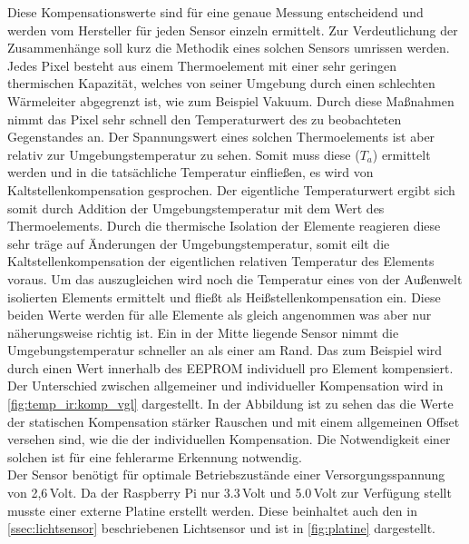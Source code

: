 \documentclass{sigchi}
\begin{document}
Diese Kompensationswerte sind für eine genaue Messung entscheidend und werden vom Hersteller für jeden Sensor einzeln ermittelt. Zur Verdeutlichung der Zusammenhänge soll kurz die Methodik eines solchen Sensors umrissen werden. Jedes Pixel besteht aus einem Thermoelement mit einer sehr geringen thermischen Kapazität, welches von seiner Umgebung durch einen schlechten Wärmeleiter abgegrenzt ist, wie zum Beispiel Vakuum. Durch diese Maßnahmen nimmt das Pixel sehr schnell den Temperaturwert des zu beobachteten Gegenstandes an. Der Spannungswert eines solchen Thermoelements ist aber relativ zur Umgebungstemperatur zu sehen. Somit muss diese ($T_a$) ermittelt werden und in die tatsächliche Temperatur einfließen, es wird von Kaltstellenkompensation gesprochen. Der eigentliche Temperaturwert ergibt sich somit durch Addition der Umgebungstemperatur mit dem Wert des Thermoelements. Durch die thermische Isolation der Elemente reagieren diese sehr träge auf Änderungen der Umgebungstemperatur, somit eilt die Kaltstellenkompensation der eigentlichen relativen Temperatur des Elements voraus. Um das auszugleichen wird noch die Temperatur eines von der Außenwelt isolierten Elements ermittelt und fließt als Heißstellenkompensation ein. Diese beiden Werte werden für alle Elemente als gleich angenommen was aber nur näherungsweise richtig ist. Ein in der Mitte liegende Sensor nimmt die Umgebungstemperatur schneller an als einer am Rand. Das zum Beispiel wird durch einen Wert innerhalb des \gls{EEPROM} individuell pro Element kompensiert. Der Unterschied zwischen allgemeiner und individueller Kompensation wird in \autoref{fig:temp_ir:komp_vgl} dargestellt.
In der Abbildung ist zu sehen das die Werte der statischen Kompensation stärker Rauschen und mit einem allgemeinen Offset versehen sind, wie die der individuellen Kompensation. Die Notwendigkeit einer solchen ist für eine fehlerarme Erkennung notwendig.\\
Der Sensor benötigt für optimale Betriebszustände einer Versorgungsspannung von 2,6\,Volt. Da der Raspberry Pi nur 3.3\,Volt und 5.0\,Volt zur Verfügung stellt musste einer externe Platine erstellt werden. Diese beinhaltet auch den in \autoref{ssec:lichtsensor} beschriebenen Lichtsensor und ist in \autoref{fig:platine} dargestellt. 
\end{document}
